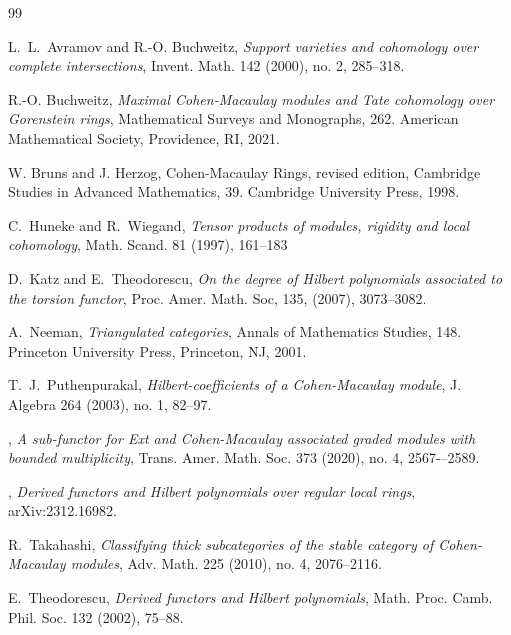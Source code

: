 \documentclass{amsart}
\theoremstyle{plain}
\theoremstyle{definition}
\theoremstyle{remark}
\begin{document}
\begin{thebibliography} {99}

L.~L.~Avramov and R.-O. Buchweitz,
\emph{Support varieties and cohomology over complete intersections},
Invent. Math. 142 (2000), no. 2, 285--318.

          R.-O. Buchweitz,
		\emph{Maximal {C}ohen-{M}acaulay modules and {T}ate cohomology over {G}orenstein rings},
Mathematical Surveys and Monographs, 262. American Mathematical Society, Providence, RI, 2021.



  W. Bruns and J. Herzog,
Cohen-Macaulay Rings, revised edition,
Cambridge Studies in Advanced Mathematics, 39.
Cambridge University Press, 1998.

C.~Huneke and R.~Wiegand,
\emph{Tensor products of modules, rigidity and local cohomology},
 Math. Scand. 81 (1997), 161--183

D.~Katz and E.~Theodorescu,
\emph{On the degree of Hilbert polynomials associated to the torsion functor},
Proc. Amer. Math. Soc, 135, (2007),  3073--3082.

 A.~Neeman,
 \emph{Triangulated categories},
  Annals of Mathematics Studies, 148. Princeton University Press, Princeton, NJ, 2001.


T.~J.~Puthenpurakal,
 \emph{Hilbert-coefficients of a Cohen-Macaulay module},
J. Algebra 264 (2003), no. 1, 82--97.




\bysame,
\emph{A sub-functor for Ext and Cohen-Macaulay associated graded modules with bounded multiplicity},
Trans. Amer. Math. Soc. 373 (2020), no. 4, 2567-–2589.

\bysame,
\emph{Derived functors and Hilbert polynomials over regular local rings},
 arXiv:2312.16982.

R.~Takahashi,
\emph{Classifying thick subcategories of the stable category of Cohen-Macaulay modules},
Adv. Math. 225 (2010), no. 4, 2076--2116.

E.~Theodorescu,
\emph{Derived functors and Hilbert polynomials},
Math. Proc. Camb. Phil. Soc. 132 (2002), 75--88.


\end{thebibliography}
\end{document}

